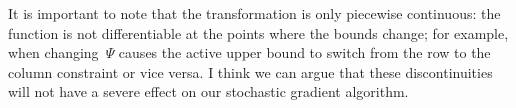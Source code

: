 It is important to note that the transformation is only piecewise
continuous: the function is not differentiable at the points where
the bounds change; for example, when changing~$\Psi$ causes the
active upper bound to switch from the row to the column constraint
or vice versa.  I think we can argue that these discontinuities
will not have a severe effect on our stochastic gradient algorithm.

\begin{comment}
\subsection{Numerical stability}
Perhaps the bigger issue is that the inverse transformation can
become very unstable when the upper and lower bounds converge.
Likewise, at these points, the determinant calculation becomes
highly unstable.  To avoid this issue, we can require that each
stick is at least $\epsilon$ by limiting the upper bounds as
follows:
\begin{align}
  {\pi}_{ij} &\leq 1 - (n-j)\epsilon - \sum_{k=1}^{j-1} {\pi}_{ik}, \\
  {\pi}_{ij} &\leq 1 - (n-i)\epsilon - \sum_{k=1}^{i-1} {\pi}_{kj}.
\end{align}
These imply a new lower bound as well,
\begin{align}
{1 - \sum_{k=1}^j \pi_{ik}}
&\leq  {\sum_{m=j+1}^n (1- (n-i)\epsilon - \sum_{k=1}^{i-1} {\pi}_{km})}
\end{align}
Rearranging terms, we have,
\begin{align}
\pi_{ij} &\geq 1- \sum_{k=1}^{j-1} \pi_{ik} - \sum_{m=j+1}^n (1- (n-i)\epsilon -  \sum_{k=1}^{i-1} {\pi}_{km}) \\
&= 1 - (n - j) (1- (n-i) \epsilon)  - \sum_{k=1}^{j-1} \pi_{ik}  +  \sum_{k=1}^{i-1} \sum_{m=j+1}^n {\pi}_{km} \\
&= 1 - (n - j) + (n-j)(n-i) \epsilon  - \sum_{k=1}^{j-1} \pi_{ik}  +  \sum_{k=1}^{i-1} \sum_{m=j+1}^n {\pi}_{km}
\end{align}


When we attempt to invert this transformation, this will ensure that
$u_{ij} - \ell_{ij} \geq \epsilon$.
\end{comment}












































